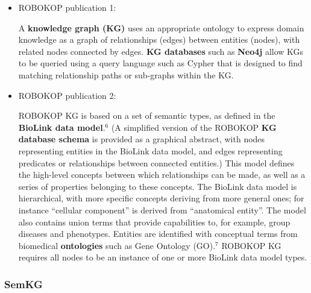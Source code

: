 \documentclass{article}
\begin{document}
\begin{itemize}

\item ROBOKOP publication 1:
\begin{displayquote}
A \textbf{knowledge graph (KG)} uses an appropriate ontology to express domain knowledge as a graph of relationships (edges) between entities (nodes), with related nodes connected by edges. \textbf{KG databases} such as \textbf{Neo4j} allow KGs to be queried using a query language such as Cypher that is designed to find matching relationship paths or sub-graphs within the KG.
\end{displayquote}

\item ROBOKOP publication 2:
\begin{displayquote}
ROBOKOP KG is based on a set of semantic types, as defined in the \textbf{BioLink data model}.$^6$ (A simplified version of the ROBOKOP \textbf{KG database schema} is provided as a graphical abstract, with nodes representing entities in the BioLink data model, and edges representing predicates or relationships between connected entities.) This model defines the high-level concepts between which relationships can be made, as well as a series of properties belonging to these concepts. The BioLink data model is hierarchical, with more specific concepts deriving from more general ones; for instance “cellular component” is derived from “anatomical entity”. The model also contains union terms that provide capabilities to, for example, group diseases and phenotypes. Entities are identified with conceptual terms from biomedical \textbf{ontologies} such as Gene Ontology (GO).$^7$ ROBOKOP KG requires all nodes to be an instance of one or more BioLink data model types.
\end{displayquote}

\end{itemize}


\subsubsection{SemKG}
\end{document}

